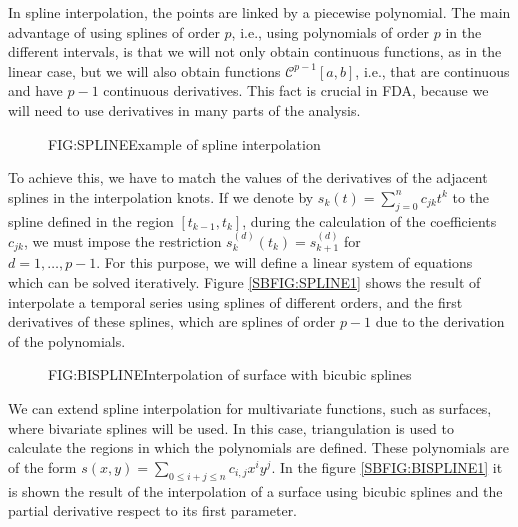 
In spline interpolation\cite{Boor1981}, the points are linked by a piecewise
polynomial.
The main advantage of using splines of order $p$, i.e., using polynomials of
order $p$ in the different intervals, is that we will not only obtain continuous
functions, as in the linear case, but we will also obtain functions
$\mathcal{C}^{p-1}[a,b]$, i.e., that are continuous and have $p-1$ continuous
derivatives. This fact is crucial in FDA, because we will need
to use derivatives in many parts of the analysis.

\begin{figure}[Example of spline interpolation]{FIG:SPLINE}{Example of spline interpolation}
	 \quad
\end{figure}

To achieve this, we have to match the values of the derivatives of the
adjacent splines in the interpolation knots. If we denote by
$s_k(t)=\sum_{j=0}^n c_{jk} t^k$ to the spline defined in the region
$[t_{k-1}, t_{k}]$, during the calculation of the coefficients $c_{jk}$, we must
impose the restriction $s_{k}^{(d)}(t_k) = s_{k+1}^{(d)}$ for \\ $d=1, \dots, p-1$.
For this purpose, we will define a linear system of equations which can be
solved iteratively. Figure \ref{SBFIG:SPLINE1} shows the result of interpolate a
temporal series using splines of different orders, and the first derivatives of
these splines, which are splines of order $p-1$ due to the derivation of the
polynomials.

\begin{figure}[Interpolation of surface]{FIG:BISPLINE}{Interpolation of surface with bicubic splines}
	 \quad
\end{figure}

We can extend spline interpolation for multivariate functions, such as surfaces,
where bivariate splines will be used. In this case, triangulation is used
to calculate the regions in which the polynomials are defined. These polynomials
are of the form $s(x, y) = \sum_{0 \le i + j \le n} c_{i,j}x^i y^j$.
In the figure \ref{SBFIG:BISPLINE1} it is shown the result of the
interpolation of a surface using bicubic splines and the partial derivative
respect to its first parameter.
